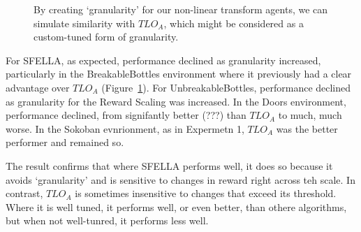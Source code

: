 \begin{figure}
  \caption{By creating `granularity' for our non-linear transform agents, we can simulate similarity with $TLO_A$, which might be considered as a custom-tuned form of granularity.
  }
   \label{fig:exp3_main}
 \end{figure}
 
For SFELLA, as expected, performance declined as granularity increased, particularly in the BreakableBottles environment where it previously had a clear advantage over $TLO_A$ (Figure~\ref{fig:exp3_main}). For UnbreakableBottles, performance declined as granularity for the Reward Scaling was increased. In the Doors environment, performance declined, from signifantly better (???) than $TLO_A$ to much, much worse. In the Sokoban evnrionment, as in Expermetn 1, $TLO_A$ was the better performer and remained so.

The result confirms that where SFELLA performs well, it does so because it avoids `granularity' and is sensitive to changes in reward right across teh scale. In contrast, $TLO_A$ is sometimes insensitive to changes that exceed its threshold. Where it is well tuned, it performs well, or even better, than othere algorithms, but when not well-tunred, it performs less well.



